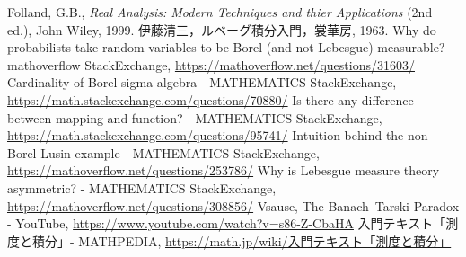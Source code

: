 \begin{thebibliography}{99}
	 Folland, G.B., \textit{Real Analysis: Modern Techniques and thier Applications} (2nd ed.), John Wiley, 1999.
	 伊藤清三，ルベーグ積分入門，裳華房, 1963.
	 Why do probabilists take random variables to be Borel (and not Lebesgue) measurable? - mathoverflow StackExchange,
		\url{https://mathoverflow.net/questions/31603/}
	 Cardinality of Borel sigma algebra - MATHEMATICS StackExchange,\\
		\url{https://math.stackexchange.com/questions/70880/}
	 Is there any difference between mapping and function? - MATHEMATICS StackExchange,\\
		\url{https://math.stackexchange.com/questions/95741/}
	 Intuition behind the non-Borel Lusin example - MATHEMATICS StackExchange,\\
		\url{https://mathoverflow.net/questions/253786/}
	 Why is Lebesgue measure theory asymmetric? - MATHEMATICS StackExchange,\\
		\url{https://mathoverflow.net/questions/308856/}
	 Vsause, The Banach–Tarski Paradox - YouTube,
		\url{https://www.youtube.com/watch?v=s86-Z-CbaHA}
	 入門テキスト「測度と積分」- MATHPEDIA,
		\href{https://math.jp/wiki/%E5%85%A5%E9%96%80%E3%83%86%E3%82%AD%E3%82%B9%E3%83%88%E3%80%8C%E6%B8%AC%E5%BA%A6%E3%81%A8%E7%A9%8D%E5%88%86%E3%80%8D}{https://math.jp/wiki/入門テキスト「測度と積分」}
\end{thebibliography}
